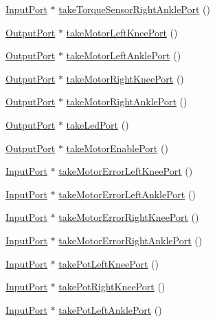 \begin{DoxyCompactItemize}
\item 
\hyperlink{classInputPort}{Input\+Port} $\ast$ \hyperlink{classBoard_a2728251277213d1d3b51adc60d57c88c}{take\+Torque\+Sensor\+Right\+Ankle\+Port} ()
\item 
\hyperlink{classOutputPort}{Output\+Port} $\ast$ \hyperlink{classBoard_ae11de17a46428a72a2596b0b462193ee}{take\+Motor\+Left\+Knee\+Port} ()
\item 
\hyperlink{classOutputPort}{Output\+Port} $\ast$ \hyperlink{classBoard_a7185650a74ca6795c38bf66e6acb0d71}{take\+Motor\+Left\+Ankle\+Port} ()
\item 
\hyperlink{classOutputPort}{Output\+Port} $\ast$ \hyperlink{classBoard_af96d2b8c37435f2b0430238cdfabaf13}{take\+Motor\+Right\+Knee\+Port} ()
\item 
\hyperlink{classOutputPort}{Output\+Port} $\ast$ \hyperlink{classBoard_aa54cf724971416290d50e807b0afbc19}{take\+Motor\+Right\+Ankle\+Port} ()
\item 
\hyperlink{classOutputPort}{Output\+Port} $\ast$ \hyperlink{classBoard_a7771c3fc5e365b4a8f2c3db312792f5a}{take\+Led\+Port} ()
\item 
\hyperlink{classOutputPort}{Output\+Port} $\ast$ \hyperlink{classBoard_a4ec97cefdf203ed9fcafddd098bd194f}{take\+Motor\+Enable\+Port} ()
\item 
\hyperlink{classInputPort}{Input\+Port} $\ast$ \hyperlink{classBoard_a55d3bf54fbec7225b507f44e7826a6d1}{take\+Motor\+Error\+Left\+Knee\+Port} ()
\item 
\hyperlink{classInputPort}{Input\+Port} $\ast$ \hyperlink{classBoard_a40da12d162a16f92111525007e28abd5}{take\+Motor\+Error\+Left\+Ankle\+Port} ()
\item 
\hyperlink{classInputPort}{Input\+Port} $\ast$ \hyperlink{classBoard_ac70e1db27663c5b2f55a744d55846b55}{take\+Motor\+Error\+Right\+Knee\+Port} ()
\item 
\hyperlink{classInputPort}{Input\+Port} $\ast$ \hyperlink{classBoard_affcf61ded54f8e2149c014b6147c0bd0}{take\+Motor\+Error\+Right\+Ankle\+Port} ()
\item 
\hyperlink{classInputPort}{Input\+Port} $\ast$ \hyperlink{classBoard_a625f45733819f5e144bceb61ce886831}{take\+Pot\+Left\+Knee\+Port} ()
\item 
\hyperlink{classInputPort}{Input\+Port} $\ast$ \hyperlink{classBoard_a25d4d7b2a40147c681f1bd50c1037557}{take\+Pot\+Right\+Knee\+Port} ()
\item 
\hyperlink{classInputPort}{Input\+Port} $\ast$ \hyperlink{classBoard_a654483cd7d4d93b768d1b8eb981fbff2}{take\+Pot\+Left\+Ankle\+Port} ()

\end{DoxyCompactItemize}
